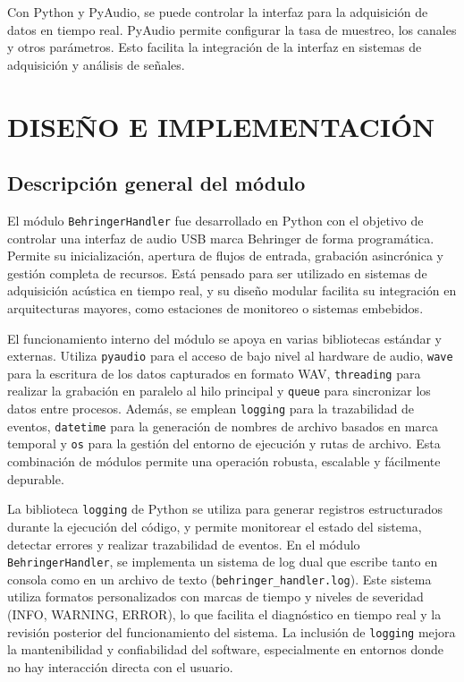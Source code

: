 Con Python y PyAudio, se puede controlar la interfaz para la adquisición de datos en tiempo real. PyAudio permite configurar la tasa de muestreo, los canales y otros parámetros. Esto facilita la integración de la interfaz en sistemas de adquisición y análisis de señales.




	
\clearpage
\section{DISEÑO E IMPLEMENTACIÓN }

\subsection{Descripción general del módulo}

El módulo \texttt{BehringerHandler} fue desarrollado en Python con el objetivo de controlar una interfaz de audio USB marca Behringer de forma programática. Permite su inicialización, apertura de flujos de entrada, grabación asincrónica y gestión completa de recursos. Está pensado para ser utilizado en sistemas de adquisición acústica en tiempo real, y su diseño modular facilita su integración en arquitecturas mayores, como estaciones de monitoreo o sistemas embebidos.

El funcionamiento interno del módulo se apoya en varias bibliotecas estándar y externas. Utiliza \texttt{pyaudio} para el acceso de bajo nivel al hardware de audio, \texttt{wave} para la escritura de los datos capturados en formato WAV, \texttt{threading} para realizar la grabación en paralelo al hilo principal y \texttt{queue} para sincronizar los datos entre procesos. Además, se emplean \texttt{logging} para la trazabilidad de eventos, \texttt{datetime} para la generación de nombres de archivo basados en marca temporal y \texttt{os} para la gestión del entorno de ejecución y rutas de archivo. Esta combinación de módulos permite una operación robusta, escalable y fácilmente depurable.

La biblioteca \texttt{logging} de Python se utiliza para generar registros estructurados durante la ejecución del código, y permite monitorear el estado del sistema, detectar errores y realizar trazabilidad de eventos. En el módulo \texttt{BehringerHandler}, se implementa un sistema de log dual que escribe tanto en consola como en un archivo de texto (\texttt{behringer\_handler.log}). Este sistema utiliza formatos personalizados con marcas de tiempo y niveles de severidad (INFO, WARNING, ERROR), lo que facilita el diagnóstico en tiempo real y la revisión posterior del funcionamiento del sistema. La inclusión de \texttt{logging} mejora la mantenibilidad y confiabilidad del software, especialmente en entornos donde no hay interacción directa con el usuario.

